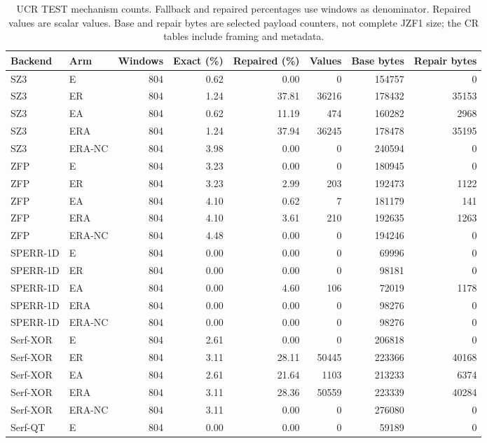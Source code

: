\begin{table}[t]
\centering
\small
\setlength{\tabcolsep}{5pt}
\caption{UCR TEST mechanism counts. Fallback and repaired percentages use windows as denominator. Repaired values are scalar values. Base and repair bytes are selected payload counters, not complete JZF1 size; the CR tables include framing and metadata.}
\label{tab:s-ablation-mechanism-ucr}
\begin{tabular}{@{}llrrrrrr@{}}
\toprule
Backend & Arm & Windows & Exact (\%) & Repaired (\%) & Values & Base bytes & Repair bytes \\
\midrule
SZ3 & E & 804 & 0.62 & 0.00 & 0 & 154757 & 0 \\
SZ3 & ER & 804 & 1.24 & 37.81 & 36216 & 178432 & 35153 \\
SZ3 & EA & 804 & 0.62 & 11.19 & 474 & 160282 & 2968 \\
SZ3 & ERA & 804 & 1.24 & 37.94 & 36245 & 178478 & 35195 \\
SZ3 & ERA-NC & 804 & 3.98 & 0.00 & 0 & 240594 & 0 \\
ZFP & E & 804 & 3.23 & 0.00 & 0 & 180945 & 0 \\
ZFP & ER & 804 & 3.23 & 2.99 & 203 & 192473 & 1122 \\
ZFP & EA & 804 & 4.10 & 0.62 & 7 & 181179 & 141 \\
ZFP & ERA & 804 & 4.10 & 3.61 & 210 & 192635 & 1263 \\
ZFP & ERA-NC & 804 & 4.48 & 0.00 & 0 & 194246 & 0 \\
SPERR-1D & E & 804 & 0.00 & 0.00 & 0 & 69996 & 0 \\
SPERR-1D & ER & 804 & 0.00 & 0.00 & 0 & 98181 & 0 \\
SPERR-1D & EA & 804 & 0.00 & 4.60 & 106 & 72019 & 1178 \\
SPERR-1D & ERA & 804 & 0.00 & 0.00 & 0 & 98276 & 0 \\
SPERR-1D & ERA-NC & 804 & 0.00 & 0.00 & 0 & 98276 & 0 \\
Serf-XOR & E & 804 & 2.61 & 0.00 & 0 & 206818 & 0 \\
Serf-XOR & ER & 804 & 3.11 & 28.11 & 50445 & 223366 & 40168 \\
Serf-XOR & EA & 804 & 2.61 & 21.64 & 1103 & 213233 & 6374 \\
Serf-XOR & ERA & 804 & 3.11 & 28.36 & 50559 & 223339 & 40284 \\
Serf-XOR & ERA-NC & 804 & 3.11 & 0.00 & 0 & 276080 & 0 \\
Serf-QT & E & 804 & 0.00 & 0.00 & 0 & 59189 & 0 \\

\end{tabular}
\end{table}
